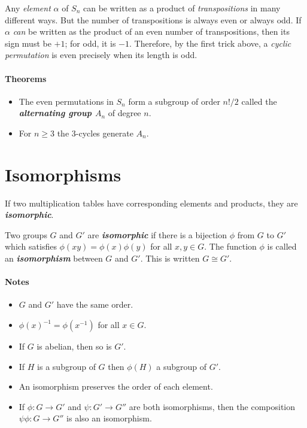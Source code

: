 \documentclass[a4paper,twocolumn,10pt]{article}
\begin{document}
  Any \textit{element} $\alpha$ of $S_n$ can be written as a product of
  \textit{transpositions} in many different ways. But the number of
  transpositions is always even or always odd. If $\alpha$ \textit{can} be
  written as the product of an even number of transpositions, then its sign
  must be $+1$; for odd, it is $-1$. Therefore, by the first trick above, a
  \textit{cyclic permutation} is even precisely when its length is odd.

  \paragraph{Theorems}
  \begin{itemize}[leftmargin=0.45in]
    \item[\theorem{6.4}] The even permutations in $S_n$ form a subgroup of
      order $n!/2$ called the \textbf{\textit{alternating group $A_n$}} of
      degree $n$.

    \item[\theorem{6.5}] For $n\geqslant 3$ the 3-cycles generate $A_n$.
  \end{itemize}

  \section{Isomorphisms}
  If two multiplication tables have corresponding elements and products, they
  are \textbf{\textit{isomorphic}}.

  Two groups $G$ and $G'$ are \textbf{\textit{isomorphic}} if there is a
  bijection $\phi$ from $G$ to $G'$ which satisfies $\phi(xy) =
  \phi{(x)}\phi{(y)}$ for all $x,y \in G$. The function $\phi$ is called an
  \textbf{\textit{isomorphism}} between $G$ and $G'$.
  This is written $G \cong G'$.

  \paragraph{Notes}
  \begin{itemize}
    \item $G$ and $G'$ have the same order.
    \item $\phi{(x)}^{-1} = \phi{(x^{-1})}$ for all $x \in G$.
    \item If $G$ is abelian, then so is $G'$.
    \item If $H$ is a subgroup of $G$ then $\phi{(H)}$ a subgroup of $G'$.
    \item An isomorphism preserves the order of each element.
    \item If $\phi\colon G \rightarrow G'$ and $\psi\colon G' \rightarrow G''$ are both
      isomorphisms, then the composition $\psi\phi\colon G \rightarrow G''$ is also
      an isomorphism.
  \end{itemize}
\end{document}
